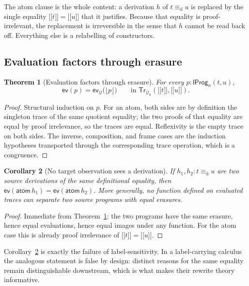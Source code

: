 \documentclass[10pt,reqno]{amsart}
\newtheorem{theorem}{Theorem}[section]
\newtheorem{corollary}[theorem]{Corollary}
\newcommand{\Tr}{\mathsf{Tr}}
\newcommand{\IProg}{\mathsf{IProg}}
\newcommand{\ev}{\mathsf{ev}}
\newcommand{\den}[1]{\mathopen{\lbrack\!\lbrack}#1\mathclose{\rbrack\!\rbrack}}
\newcommand{\defeq}{\mathrel{\equiv_{\mathrm d}}}
\newcommand{\Q}{\mathcal{Q}}
\begin{document}
The atom clause is the whole content: a derivation \(h\) of \(t\defeq u\) is
replaced by the single equality \(\den t=\den u\) that it justifies.  Because
that equality is proof-irrelevant, the replacement is irreversible in the sense
that \(h\) cannot be read back off.  Everything else is a relabelling of
constructors.

\subsection{Evaluation factors through erasure}

\begin{theorem}[Evaluation factors through erasure]
\label{thm:erasure-factorization}
For every \(p:\IProg_n(t,u)\),
\[
 \ev(p)=\ev_{\Q}\bigl(\lfloor p\rfloor\bigr)
 \qquad\text{in }\Tr_{\Q_n}(\den t,\den u).
\tag{9.3}\label{eq:erasure-factorization}
\]
\end{theorem}

\begin{proof}
Structural induction on \(p\).  For an atom, both sides are by definition the
singleton trace of the same quotient equality; the two proofs of that equality
are equal by proof irrelevance, so the traces are equal.  Reflexivity is the
empty trace on both sides.  The inverse, composition, and frame cases are the
induction hypotheses transported through the corresponding trace operation,
which is a congruence.
\end{proof}

\begin{corollary}[No target observation sees a derivation]
\label{cor:no-derivation-observation}
If \(h_1,h_2:t\defeq u\) are two source derivations of the same definitional
equality, then \(\ev(\mathsf{atom}\,h_1)=\ev(\mathsf{atom}\,h_2)\).  More
generally, no function defined on evaluated traces can separate two source
programs with equal erasures.
\end{corollary}

\begin{proof}
Immediate from Theorem~\ref{thm:erasure-factorization}: the two programs have
the same erasure, hence equal evaluations, hence equal images under any
function.  For the atom case this is already proof irrelevance of
\(\den t=\den u\).
\end{proof}

Corollary~\ref{cor:no-derivation-observation} is exactly the failure of
label-sensitivity.  In a label-carrying calculus the analogous statement is
false by design: distinct reasons for the same equality remain distinguishable
downstream, which is what makes their rewrite theory informative.
\end{document}

